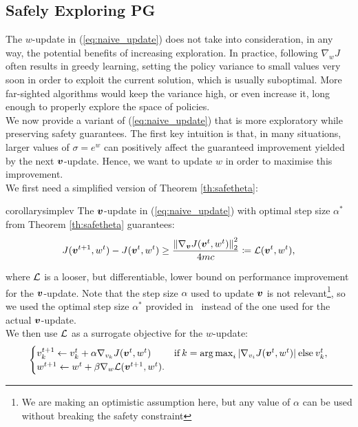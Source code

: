 \subsection{Safely Exploring PG}\label{sec:explore+safe}
The $w$-update in (\ref{eq:naive_update}) does not take into consideration, in any way, the potential benefits of increasing exploration. In practice, following $\nabla_{w}J$ often results in greedy learning, setting the policy variance to small values very soon in order to exploit the current solution, which is usually suboptimal. More far-sighted algorithms would keep the variance high, or even increase it, long enough to properly explore the space of policies. \\
We now provide a variant of (\ref{eq:naive_update}) that is more exploratory while preserving safety guarantees. The first key intuition is that, in many situations, larger values of $\sigma=e^w$ can positively affect the guaranteed improvement yielded by the next $\vv$-update. Hence, we want to update $w$ in order to maximise this improvement. \\
We first need a simplified version of Theorem \ref{th:safetheta}:
\begin{restatable}[]{corollary}{simplev}\label{th:simplev}
	The $\vv$-update in (\ref{eq:naive_update}) with optimal step size $\alpha^*$ from Theorem \ref{th:safetheta} guarantees:
	\begin{align*}
	J(\vv^{t+1},w^t) - J(\vv^t,w^t) \geq \frac{\norm[2]{\gradJ[\vv]{\vv^t,w^t}}^2}{4mc}
	\coloneqq \Deltav(\vv^t,w^t),
	\end{align*}
\end{restatable}
where $\Deltav$ is a looser, but differentiable, lower bound on performance improvement for the $\vv$-update. Note that the step size $\alpha$ used to update $\vv$ is not relevant\footnote{We are making an optimistic assumption here, but any value of $\alpha$ can be used without breaking the safety constraint}, so we used the optimal step size $\alpha^*$ provided in~\cite{adaptive_batch} instead of the one used for the actual $\vv$-update. \\
We then use $\Deltav$ as a surrogate objective for the $w$-update:
%
\begin{align}\label{up:exp}
\begin{cases}
v_{k}^{t+1} \gets v_{k}^t + \alpha\gradJ[v_{k}]{\vv^t,w^t}
& \text{if}\:k =  \argmax_i |\gradJ[v_i]{\vv^t, w^t}| \:\text{else}\:v_{k}^t,\\
w^{t+1} \gets w^t + \beta\gradDelta(\vv^{t+1}, w^t).
\end{cases}
\end{align}
